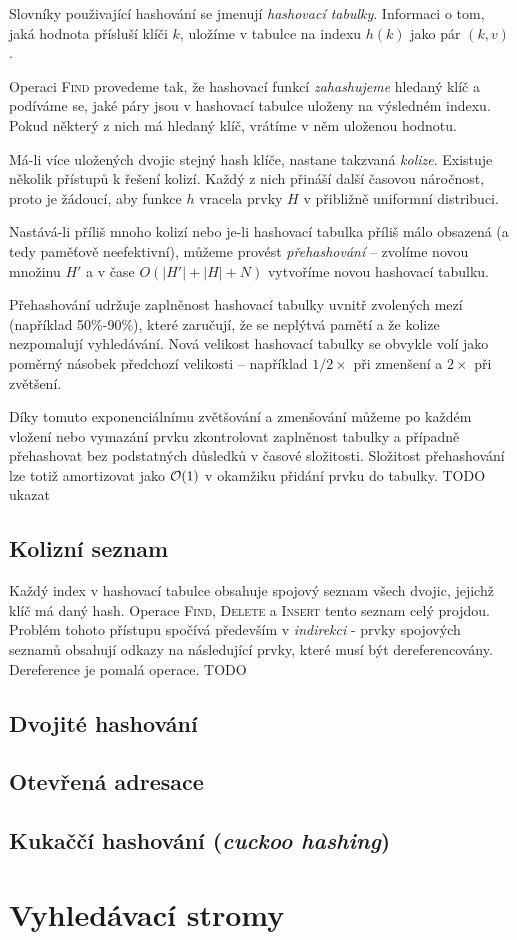 \documentclass[a4paper]{article}
\begin{document}
Slovníky použivající hashování se jmenují \textit{hashovací tabulky}.
Informaci o tom, jaká hodnota přísluší klíči $k$, uložíme
v tabulce na indexu $h(k)$ jako pár $(k,v)$.

Operaci \textsc{Find} provedeme tak, že hashovací funkcí \textit{zahashujeme}
hledaný klíč a podíváme se, jaké páry jsou v hashovací tabulce uloženy
na výsledném indexu. Pokud některý z nich má hledaný klíč, vrátíme v něm
uloženou hodnotu.

Má-li více uložených dvojic stejný hash klíče, nastane takzvaná \textit{kolize}.
Existuje několik přístupů k řešení kolizí. Každý z nich přináší další
časovou náročnost, proto je žádoucí, aby funkce $h$ vracela prvky $H$
v přibližně uniformní distribuci.

Nastává-li příliš mnoho kolizí nebo je-li hashovací tabulka příliš málo
obsazená (a tedy paměťově neefektivní), můžeme provést \textit{přehashování} --
zvolíme novou množinu $H'$ a v čase $O(|H'|+|H|+N)$ vytvoříme novou hashovací
tabulku.

Přehashování udržuje zaplněnost hashovací tabulky uvnitř zvolených mezí
(například 50\%-90\%), které zaručují, že se neplýtvá pamětí a že kolize
nezpomalují vyhledávání.
Nová velikost hashovací tabulky se obvykle volí jako poměrný násobek předchozí
velikosti -- například $1/2\times$ při zmenšení a $2\times$ při zvětšení.

Díky tomuto exponenciálnímu zvětšování a zmenšování můžeme po každém vložení
nebo vymazání prvku zkontrolovat zaplněnost tabulky a případně přehashovat bez
podstatných důsledků v časové složitosti. Složitost přehashování lze totiž
amortizovat jako $\mathcal{O}(1)$ v okamžiku přidání prvku do tabulky.
TODO ukazat

\subsection{Kolizní seznam}
Každý index v hashovací tabulce obsahuje spojový seznam všech dvojic, jejichž
klíč má daný hash. Operace \textsc{Find}, \textsc{Delete} a \textsc{Insert}
tento seznam celý projdou. Problém tohoto přístupu spočívá především v
\textit{indirekci} - prvky spojových seznamů obsahují odkazy
na následující prvky, které musí být dereferencovány. Dereference
je pomalá operace. TODO

\subsection{Dvojité hashování}
\subsection{Otevřená adresace}
\subsection{Kukaččí hashování (\textit{cuckoo hashing})}

\section{Vyhledávací stromy}
\end{document}
